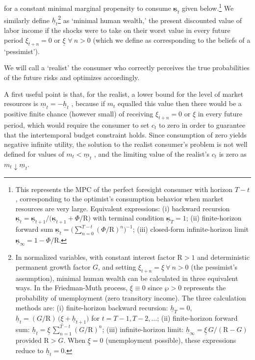 \documentclass[twocolumn, switch]{article}
\newcommand{\cNrm}{c}
\newcommand{\Rfree}{\text{R}}
\newcommand{\tranShk}{\xi}
\newcommand{\PermGroFac}{G}
\newcommand{\WorstProb}{\wp}
\newcommand{\mNrm}{m}
\newcommand{\AbsPatFac}{\Phi}
\newcommand{\hNrm}{h}
\newcommand{\MPC}{\boldsymbol{\kappa}}
\newcommand{\MPCmin}{\underline{\MPC}}
\newcommand{\hNrmPes}{\underline{\hNrm}}
\newcommand{\tranShkMin}{\underline{\tranShk}}
\newcommand{\mNrmMin}{\underline{\mNrm}}
\begin{document}
for a constant minimal marginal propensity to consume $\MPCmin_{t}$ given
below.\footnote{This represents
the MPC of the perfect foresight consumer with horizon $T -t$, corresponding to
the optimist's consumption behavior when market resources are very large.
Equivalent expressions: (i) backward recursion
$\MPCmin_{t}=\MPCmin_{t+1}/\bigl(\MPCmin_{t+1}+\AbsPatFac/\Rfree\bigr)$
with terminal condition $\MPCmin_T=1$; (ii) finite-horizon forward sum
$\MPCmin_{t}=\bigl(\sum_{n=0}^{T -t}(\AbsPatFac/\Rfree)^{n}\bigr)^{ -1}$;
(iii) closed-form infinite-horizon limit $\MPCmin_{\infty}=1 -\AbsPatFac/\Rfree$.} We similarly define
$\hNrmPes_{t}$\footnote{In normalized variables, with constant interest factor $\Rfree>1$ and
deterministic permanent growth factor $\PermGroFac$, and setting
$\tranShk_{t+n}=\tranShkMin~\forall~n>0$ (the pessimist's assumption),
minimal human wealth can be calculated in three equivalent ways.
In the Friedman-Muth process, $\tranShkMin \equiv 0$ since $\WorstProb > 0$
represents the probability of unemployment (zero transitory income).
The three calculation methods are: (i) finite-horizon backward recursion: $\hNrmPes_{T}=0$,
$\hNrmPes_{t}=(\PermGroFac/\Rfree)\,\bigl(\tranShkMin + \hNrmPes_{t+1}\bigr)$
for $t = T -1, T -2, \ldots$; (ii) finite-horizon forward sum:
$\hNrmPes_{t}=\tranShkMin\,\sum_{n=1}^{T -t}(\PermGroFac/\Rfree)^{n}$;
(iii) infinite-horizon limit: $\hNrmPes_{\infty}=\tranShkMin\,\PermGroFac/(\Rfree -\PermGroFac)$
provided $\Rfree>\PermGroFac$. When $\tranShkMin=0$ (unemployment possible),
these expressions reduce to $\hNrmPes_{t}=0$.} as `minimal human wealth,' the present
discounted value of labor income if the shocks were to take on their worst
value in every future period
$\tranShk_{t+n} = 0$ or $\tranShkMin$ $\forall~n>0$ (which we define as corresponding to the beliefs of a `pessimist').

We will call a `realist' the consumer who correctly perceives the true
probabilities of the future risks and optimizes accordingly.

A first useful point is that, for the realist, a lower bound for the level of
market resources is $\mNrmMin_{t} = -\hNrmPes_{t}$ \citep{Aiyagari1994, Huggett1993}, because if $\mNrm_{t}$
equalled this value then there would be a positive finite chance (however small)
of receiving $\tranShk_{t+n} = 0$ or $\tranShkMin$ in every future period, which
would require the consumer to set $\cNrm_{t}$ to zero in order to guarantee that the
intertemporal budget constraint holds. Since consumption of zero yields negative
infinite utility, the solution to the realist consumer's problem is not well
defined for values of $\mNrm_{t} < \mNrmMin_{t}$ \citep{Zeldes1989, Deaton1991}, and the limiting value of the
realist's $\cNrm_{t}$ is zero as $\mNrm_{t} \downarrow \mNrmMin_{t}$.
\end{document}

